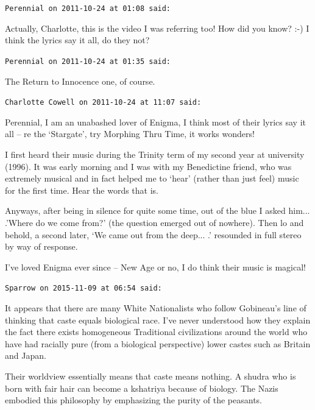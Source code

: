 \begin{footnotesize}
\begin{sffamily}
\hfill

\texttt{Perennial on 2011-10-24 at 01:08 said:}

Actually, Charlotte, this is the video I was referring too! How did you know? :-) I think the lyrics say it all, do they not?

\hfill

\texttt{Perennial on 2011-10-24 at 01:35 said:}

The Return to Innocence one, of course.

\hfill

\texttt{Charlotte Cowell on 2011-10-24 at 11:07 said:}

Perennial, I am an unabashed lover of Enigma, I think most of their lyrics say it all -- re the `Stargate', try Morphing Thru Time, it works wonders!

I first heard their music during the Trinity term of my second year at university (1996). It was early morning and I was with my Benedictine friend, who was extremely musical and in fact helped me to `hear' (rather than just feel) music for the first time. Hear the words that is.

Anyways, after being in silence for quite some time, out of the blue I asked him... .'Where do we come from?' (the question emerged out of nowhere). Then lo and behold, a second later, `We came out from the deep... .' resounded in full stereo by way of response.

I've loved Enigma ever since -- New Age or no, I do think their music is magical!

\hfill

\texttt{Sparrow on 2015-11-09 at 06:54 said:}

It appears that there are many White Nationalists who follow Gobineau's line of thinking that caste equals biological race. I've never understood how they explain the fact there exists homogeneous Traditional civilizations around the world who have had racially pure (from a biological perspective) lower castes such as Britain and Japan.

Their worldview essentially means that caste means nothing. A shudra who is born with fair hair can become a kshatriya because of biology. The Nazis embodied this philosophy by emphasizing the purity of the peasants.


\hfill

\end{sffamily}
\end{footnotesize}


